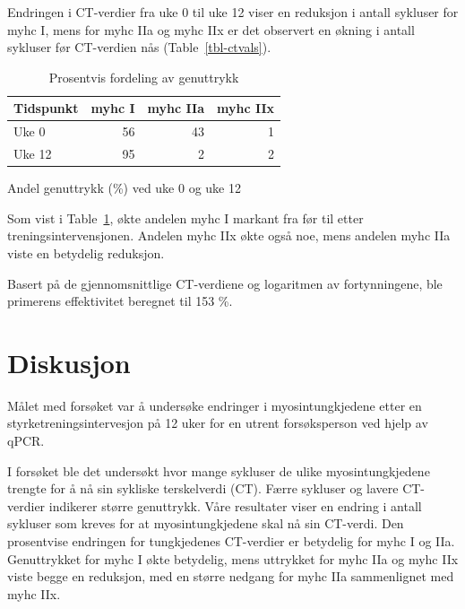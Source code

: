 \documentclass[
  letterpaper,
  DIV=11,
  numbers=noendperiod]{scrreprt}
\begin{document}
Endringen i CT-verdier fra uke 0 til uke 12 viser en reduksjon i antall
sykluser for myhc I, mens for myhc IIa og myhc IIx er det observert en
økning i antall sykluser før CT-verdien nås (Table~\ref{tbl-ctvals}).

\begingroup
\fontsize{12.0pt}{14.4pt}\selectfont
\setlength{\LTpost}{0mm}

\begin{longtable}{lrrr}

\caption{\label{tbl-genes}Prosentvis fordeling av genuttrykk}

\tabularnewline

\toprule
Tidspunkt & myhc I & myhc IIa & myhc IIx \\ 
\midrule\addlinespace[2.5pt]
Uke 0 & 56 & 43 & 1 \\ 
Uke 12 & 95 & 2 & 2 \\ 
\bottomrule

\end{longtable}

\begin{minipage}{\linewidth}
Andel genuttrykk (\%) ved uke 0 og uke 12\\
\end{minipage}
\endgroup

Som vist i Table~\ref{tbl-genes}, økte andelen myhc I markant fra før
til etter treningsintervensjonen. Andelen myhc IIx økte også noe, mens
andelen myhc IIa viste en betydelig reduksjon.

Basert på de gjennomsnittlige CT-verdiene og logaritmen av
fortynningene, ble primerens effektivitet beregnet til 153 \%.

\section{Diskusjon}\label{diskusjon-4}

Målet med forsøket var å undersøke endringer i myosintungkjedene etter
en styrketreningsintervesjon på 12 uker for en utrent forsøksperson ved
hjelp av qPCR.

I forsøket ble det undersøkt hvor mange sykluser de ulike
myosintungkjedene trengte for å nå sin sykliske terskelverdi (CT). Færre
sykluser og lavere CT-verdier indikerer større genuttrykk. Våre
resultater viser en endring i antall sykluser som kreves for at
myosintungkjedene skal nå sin CT-verdi. Den prosentvise endringen for
tungkjedenes CT-verdier er betydelig for myhc I og IIa. Genuttrykket for
myhc I økte betydelig, mens uttrykket for myhc IIa og myhc IIx viste
begge en reduksjon, med en større nedgang for myhc IIa sammenlignet med
myhc IIx.
\end{document}
